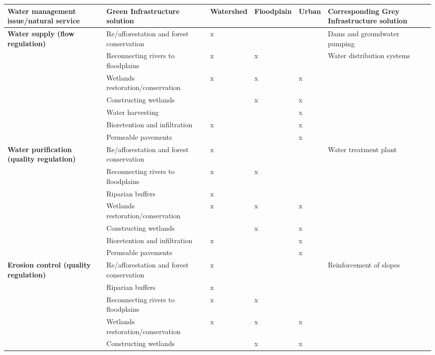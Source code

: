 \documentclass[./main_en.tex]{subfiles}
\begin{document}
{\renewcommand{\arraystretch}{1.5}
\begin{table}[t!]
    \centering	
    \tiny
    \sffamily
    \begin{tabular}{ 
 >{\raggedright\arraybackslash}m{2.5cm}  
 >{\raggedright\arraybackslash}m{3.5cm}  
 >{\raggedright\arraybackslash}m{1.0cm}
 >{\raggedright\arraybackslash}m{1.0cm}
 >{\raggedright\arraybackslash}m{1.0cm}
 >{\raggedright\arraybackslash}m{2.5cm}}
    \toprule 
    \textbf{Water management issue/natural service} & \textbf{Green Infrastructure solution} & \textbf{Watershed} & \textbf{Floodplain} & \textbf{Urban} & \textbf{Corresponding Grey Infrastructure solution}\\ 
    \midrule
    \textbf{Water supply (flow regulation)} & Re/afforestation and forest conservation & x &  &  & Dams and groundwater pumping \\
    \cline{2-5}
    & Reconnecting rivers to floodplains & x & x &  & Water distribution systems \\
    \cline{2-5}
    & Wetlands restoration/conservation & x & x & x &  \\
    \cline{2-5}
    & Constructing wetlands &  & x & x &  \\
    \cline{2-5}
    & Water harvesting &  &  & x &  \\
    \cline{2-5}
    & Bioretention and infiltration & x &  & x &  \\
    \cline{2-5}
    & Permeable pavements &  &  & x &  \\
    
    \textbf{Water purification (quality regulation)}& Re/afforestation and forest conservation & x &  &  & Water treatment plant \\
    \cline{2-5}
    & Reconnecting rivers to floodplains & x & x &  &  \\
    \cline{2-5}
    & Riparian buffers & x &  &  &  \\
    \cline{2-5}
    & Wetlands restoration/conservation & x & x & x &  \\
    \cline{2-5}
    & Constructing wetlands &  & x & x &  \\
    \cline{2-5}
    & Bioretention and infiltration & x &  & x &  \\
    \cline{2-5}
    & Permeable pavements &  &  & x &  \\
    
    \textbf{Erosion control (quality regulation)}& Re/afforestation and forest conservation & x &  &  & Reinforcement of slopes \\
    \cline{2-5}
    & Riparian buffers & x &  &  &  \\
    \cline{2-5}
    & Reconnecting rivers to floodplains & x & x &  &  \\
    \cline{2-5}
    & Wetlands restoration/conservation & x & x & x &  \\
    \cline{2-5}
    & Constructing wetlands &  & x & x &  \\
    

\end{tabular}
\end{table}}
\end{document}
